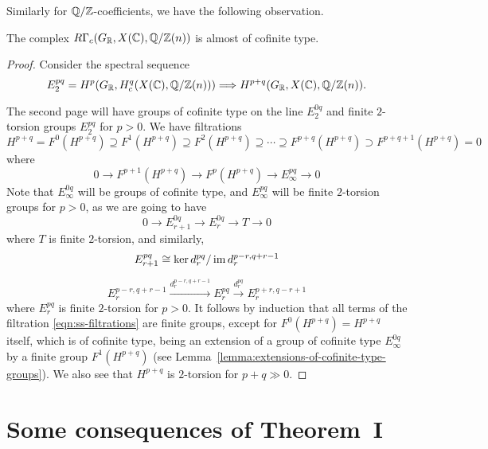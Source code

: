 \documentclass{article}
\numberwithin{equation}{section}
\begin{document}
Similarly for $\mathbb{Q}/\mathbb{Z}$-coefficients, we have the following observation.

\begin{lemma}
  \label{lemma:RGammac(GR,X(C),Q/Z(n))-almost-cofinite-type}
  The complex $R\Gamma_c (G_{\mathbb{R}}, X (\mathbb{C}), \mathbb{Q}/\mathbb{Z} (n))$
  is almost of cofinite type.

  \begin{proof}
    Consider the spectral sequence
    \[ E_2^{pq} = H^p (G_{\mathbb{R}}, H^q_c (X (\mathbb{C}), \mathbb{Q}/\mathbb{Z} (n)))
    \Longrightarrow
    H^{p+q} (G_{\mathbb{R}}, X (\mathbb{C}), \mathbb{Q}/\mathbb{Z} (n)). \]

    The second page will have groups of cofinite type on the line $E_2^{0q}$ and
    finite $2$-torsion groups $E_2^{pq}$ for $p > 0$. We have filtrations
    \begin{equation}
      \label{eqn:ss-filtrations}
      H^{p+q} = F^0 (H^{p+q}) \supseteq
      F^1 (H^{p+q}) \supseteq
      F^2 (H^{p+q}) \supseteq \cdots \supseteq
      F^{p+q} (H^{p+q}) \supset F^{p+q+1} (H^{p+q}) = 0
    \end{equation}
    where
    $$0 \to F^{p+1} (H^{p+q}) \to F^p (H^{p+q}) \to E_\infty^{pq} \to 0$$
    Note that $E^{0q}_\infty$ will be groups of cofinite type, and
    $E^{pq}_\infty$ will be finite $2$-torsion groups for $p > 0$, as we are
    going to have
    $$0 \to E_{r+1}^{0q} \to E_r^{0q} \to T \to 0$$
    where $T$ is finite $2$-torsion, and similarly,
    $$E_{r+1}^{pq} \cong \ker d_r^{pq} / \operatorname{im} d_r^{p-r,q+r-1}$$

    \[ E_r^{p-r,q+r-1} \xrightarrow{d_r^{p-r,q+r-1}}
    E_r^{pq} \xrightarrow{d_r^{pq}} E_r^{p+r,q-r+1} \]
    where $E_r^{pq}$ is finite $2$-torsion for $p > 0$. It follows by induction
    that all terms of the filtration \eqref{eqn:ss-filtrations} are finite
    groups, except for $F^0 (H^{p+q}) = H^{p+q}$ itself, which is of cofinite
    type, being an extension of a group of cofinite type $E_\infty^{0q}$ by a
    finite group $F^1 (H^{p+q})$ (see
    Lemma~\ref{lemma:extensions-of-cofinite-type-groups}). We also see that
    $H^{p+q}$ is $2$-torsion for $p+q \gg 0$.
  \end{proof}
\end{lemma}


\section{Some consequences of Theorem~I}
\label{sec:consequences-of-theorem-I}
\end{document}
